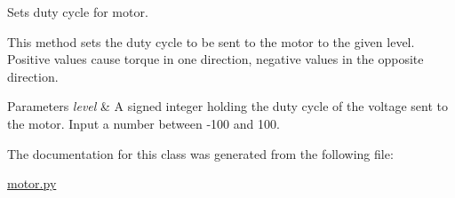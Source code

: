 Sets duty cycle for motor. 

This method sets the duty cycle to be sent to the motor to the given level. Positive values cause torque in one direction, negative values in the opposite direction.


\begin{DoxyParams}{Parameters}
{\em level} & A signed integer holding the duty cycle of the voltage sent to the motor. Input a number between -\/100 and 100. \\
\hline
\end{DoxyParams}


The documentation for this class was generated from the following file\+:\begin{DoxyCompactItemize}
\item 
\mbox{\hyperlink{motor_8py}{motor.\+py}}\end{DoxyCompactItemize}
